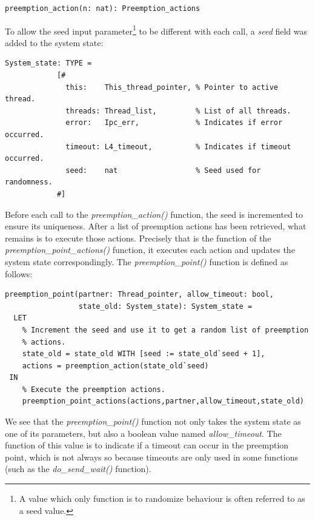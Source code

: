 \lstset{language=PVS}
\begin{lstlisting}[caption={PVS: \emph{preemption\_action()} function.}]
% Return a (random) preemption action.
preemption_action(n: nat): Preemption_actions
\end{lstlisting}

To allow the seed input parameter\footnote{A value which only function is to randomize behaviour is often referred to as a seed value.} to be different with each call, a \emph{seed} field was added to the system state:
\lstset{language=PVS}
\begin{lstlisting}[caption={PVS: expanded system state, with added \emph{seed} field.}]
% Modified system state with added <seed> field.
System_state: TYPE = 
            [# 
              this:    This_thread_pointer, % Pointer to active thread.
              threads: Thread_list,         % List of all threads.
              error:   Ipc_err,             % Indicates if error occurred.
              timeout: L4_timeout,          % Indicates if timeout occurred.
              seed:    nat                  % Seed used for randomness.
            #]
\end{lstlisting}

Before each call to the \emph{preemption\_action()} function, the seed is incremented to ensure its uniqueness. After a list of preemption actions has been retrieved, what remains is to execute those actions. Precisely that is the function of the \emph{preemption\_point\_actions()} function, it executes each action and updates the system state correspondingly. The \emph{preemption\_point()} function is defined as follows:

\lstset{language=PVS}
\begin{lstlisting}[caption={PVS: \emph{preemption\_point()} function.}]
preemption_point(partner: Thread_pointer, allow_timeout: bool, 
                 state_old: System_state): System_state =
  LET 
    % Increment the seed and use it to get a random list of preemption 
    % actions.
    state_old = state_old WITH [seed := state_old`seed + 1],
    actions = preemption_action(state_old`seed)
 IN
    % Execute the preemption actions.
    preemption_point_actions(actions,partner,allow_timeout,state_old)
\end{lstlisting}

We see that the \emph{preemption\_point()} function not only takes the system state as one of its parameters, but also a boolean value named \emph{allow\_timeout}. The function of this value is to indicate if a timeout can occur in the preemption point, which is not always so because timeouts are only used in some functions (such as the \emph{do\_send\_wait()} function).

